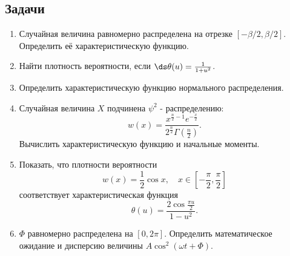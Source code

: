 \subsection{Задачи}
\begin{enumerate}
    \item Случайная величина равномерно распределена на отрезке
        \( [-\beta/2, \beta/2] \). Определить её характеристическую функцию.
    \item Найти плотность вероятности, если
        \( \ds \theta(u) = \frac{1}{1+u^2} \).
    \item Определить характеристическую функцию нормального распределения.
    \item Случайная величина \( X \) подчинена \( \psi^2 \) - распределению:
        \[
            w(x) = \frac{x^{\frac{n}{2}-1}e^{-\frac{x}{2}}}
            {2^\frac{n}{2}\Gamma\left(\frac{n}{2}\right)}.
        \]
        Вычислить характеристическую функцию и начальные моменты.
    \item Показать, что плотности вероятности
        \[
            w(x) = \frac{1}{2}\cos x,\quad
            x\in\left[-\frac{\pi}{2},\frac{\pi}{2}\right]
        \]
        соответствует характеристическая функция
        \[
            \theta(u) = \frac{2\cos\frac{\pi u}{2}}{1-u^2}.
        \]
    \item \( \Phi \) равномерно распределена на \( [0, 2\pi] \). Определить
        математическое ожидание и дисперсию величины
        \( A\cos^2(\omega t + \Phi) \).
\end{enumerate}
